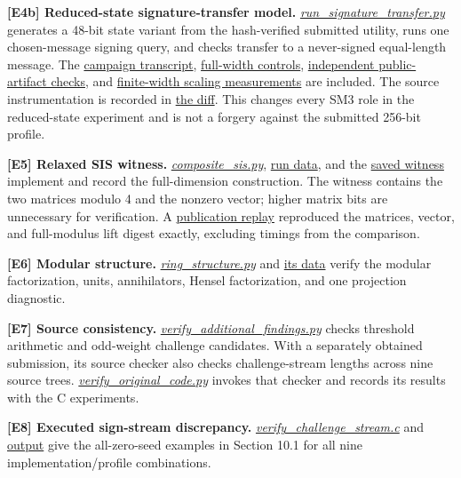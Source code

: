 \documentclass[
  american,
  10pt,
  a4paper,
]{article}
\begin{document}
\textbf{{[}E4b{]} Reduced-state signature-transfer model.}
\href{code/signature_transfer/run_signature_transfer.py}{\emph{run\_signature\_transfer.py}}
generates a 48-bit state variant from the hash-verified submitted
utility, runs one chosen-message signing query, and checks transfer to a
never-signed equal-length message. The
\href{evidence/signature_transfer/campaign_48.json}{campaign
transcript},
\href{evidence/signature_transfer/probe_fullwidth.json}{full-width
controls},
\href{evidence/signature_transfer/public_artifact_verification.json}{independent
public-artifact checks}, and
\href{evidence/signature_transfer/scale.json}{finite-width scaling
measurements} are included. The source instrumentation is recorded in
\href{evidence/signature_transfer/auxfunc-reduced-state.patch}{the
diff}. This changes every SM3 role in the reduced-state experiment and
is not a forgery against the submitted 256-bit profile.

\textbf{{[}E5{]} Relaxed SIS witness.}
\href{code/composite_sis.py}{\emph{composite\_sis.py}},
\href{evidence/composite_sis_5120.json}{run data}, and the
\href{data/sis_witness_5120.npz}{saved witness} implement and record the
full-dimension construction. The witness contains the two matrices
modulo 4 and the nonzero vector; higher matrix bits are unnecessary for
verification. A \href{evidence/composite_sis_replay.json}{publication
replay} reproduced the matrices, vector, and full-modulus lift digest
exactly, excluding timings from the comparison.

\textbf{{[}E6{]} Modular structure.}
\href{code/ring_structure.py}{\emph{ring\_structure.py}} and
\href{evidence/ring_structure.json}{its data} verify the modular
factorization, units, annihilators, Hensel factorization, and one
projection diagnostic.

\textbf{{[}E7{]} Source consistency.}
\href{code/verify_additional_findings.py}{\emph{verify\_additional\_findings.py}}
checks threshold arithmetic and odd-weight challenge candidates. With a
separately obtained submission, its source checker also checks
challenge-stream lengths across nine source trees.
\href{code/verify_original_code.py}{\emph{verify\_original\_code.py}}
invokes that checker and records its results with the C experiments.

\textbf{{[}E8{]} Executed sign-stream discrepancy.}
\href{code/verify_challenge_stream.c}{\emph{verify\_challenge\_stream.c}}
and \href{evidence/original_code.json}{output} give the all-zero-seed
examples in Section 10.1 for all nine implementation/profile
combinations.
\end{document}
